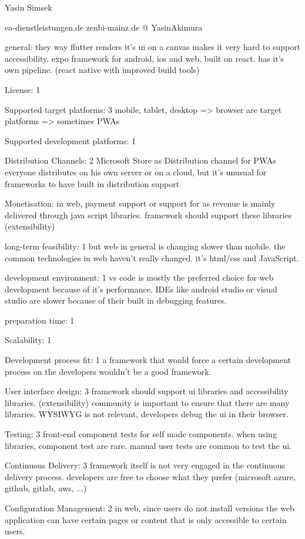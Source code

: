 Yasin Simsek

ea-dienstleistungen.de
zenbi-mainz.de
@ YasinAkimura


general: 
they way flutter renders it's ui on a canvas makes it very hard to support accessibility.
expo framework for android, ios and web. built on react. has it's own pipeline. (react native with improved build tools)

License: 
1

Supported target platforms: 
3
mobile, tablet, desktop 
=> browser are target platforms
=> sometimes PWAs

Supported development platforms:
1

Distribution Channels:
2
Microsoft Store as Distribution channel for PWAs
everyone distributes on his own server or on a cloud, but it's unusual for frameworks to have built in distribution support

Monetisation: 
in web, payment support or support for as revenue is mainly delivered through java script libraries. framework should support these libraries (extensibility)

long-term feasibility:
1
but web in general is changing slower than mobile. the common technologies in web haven't really changed. it's html/css and JavaScript. 

development environment:
1
vs code is mostly the preferred choice for web development because of it's performance. 
IDEs like android studio or visual studio are slower because of their built in debugging features.

preparation time:
1

Scalability:
1

Development process fit:
1
a framework that would force a certain development process on the developers wouldn't be a good framework.

User interface design:
3
framework should support ui libraries and accessibility libraries. (extensibility)
community is important to ensure that there are many libraries.
WYSIWYG is not relevant, developers debug the ui in their browser.

Testing: 
3
front-end component tests for self made components. when using libraries, component test are rare.
manual user tests are common to test the ui. 

Continuous Delivery:
3
framework itself is not very engaged in the continuous delivery process. 
developers are free to choose what they prefer (microsoft azure, github, gitlab, aws, ...)

Configuration Management: 
2
in web, since users do not install versions the web application can have certain pages or content that is only accessible to certain users.

